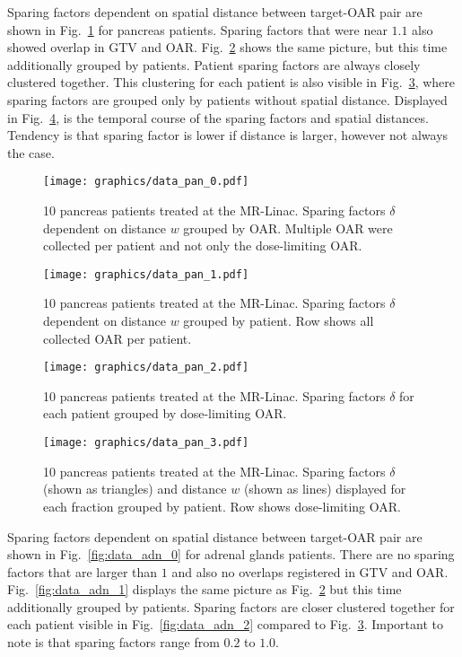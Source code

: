 \documentclass[\relativeRoot/ada.tex]{subfiles}
\begin{document}
Sparing factors dependent on spatial distance between target-OAR pair are shown in Fig.~\ref{fig:data_pan_0} for pancreas patients. Sparing factors that were near $1.1$ also showed overlap in GTV and OAR. Fig.~\ref{fig:data_pan_1} shows the same picture, but this time additionally grouped by patients. Patient sparing factors are always closely clustered together. This clustering for each patient is also visible in Fig.~\ref{fig:data_pan_2}, where sparing factors are grouped only by patients without spatial distance. Displayed in Fig.~\ref{fig:data_pan_3}, is the temporal course of the sparing factors and spatial distances. Tendency is that sparing factor is lower if distance is larger, however not always the case.

\begin{figure}[!htb]
    \centering
    \texttt{[image: graphics/data\_pan\_0.pdf]}
    \caption{10 pancreas patients treated at the MR-Linac. Sparing factors $\delta$ dependent on distance $w$ grouped by OAR. Multiple OAR were collected per patient and not only the dose-limiting OAR.}
    \label{fig:data_pan_0}
\end{figure}

\begin{figure}[!htb]
    \centering
    \texttt{[image: graphics/data\_pan\_1.pdf]}
    
    \caption{10 pancreas patients treated at the MR-Linac. Sparing factors $\delta$ dependent on distance $w$ grouped by patient. Row shows all collected OAR per patient.}
    \label{fig:data_pan_1}
\end{figure}

\begin{figure}[!htb]
    \centering
    \texttt{[image: graphics/data\_pan\_2.pdf]}
    \caption{10 pancreas patients treated at the MR-Linac. Sparing factors $\delta$ for each patient grouped by dose-limiting OAR.}
    \label{fig:data_pan_2}
\end{figure}

\begin{figure}[!htb]
    \centering
    \texttt{[image: graphics/data\_pan\_3.pdf]}
    \caption{10 pancreas patients treated at the MR-Linac. Sparing factors $\delta$ (shown as triangles) and distance $w$ (shown as lines) displayed for each fraction grouped by patient. Row shows dose-limiting OAR.}
    \label{fig:data_pan_3}
\end{figure}

Sparing factors dependent on spatial distance between target-OAR pair are shown in Fig.~\ref{fig:data_adn_0} for adrenal glands patients. There are no sparing factors that are larger than $1$ and also no overlaps registered in GTV and OAR. Fig.~\ref{fig:data_adn_1} displays the same picture as Fig.~\ref{fig:data_pan_1} but this time additionally grouped by patients. Sparing factors are closer clustered together for each patient visible in Fig.~\ref{fig:data_adn_2} compared to Fig.~\ref{fig:data_pan_2}. Important to note is that sparing factors range from $0.2$ to $1.0$.
\end{document}
